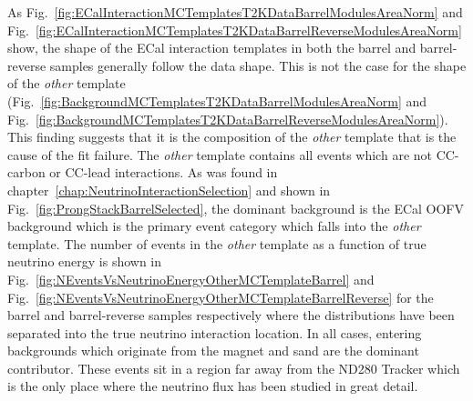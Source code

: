 As Fig.~\ref{fig:ECalInteractionMCTemplatesT2KDataBarrelModulesAreaNorm} and Fig.~\ref{fig:ECalInteractionMCTemplatesT2KDataBarrelReverseModulesAreaNorm} show, the shape of the ECal interaction templates in both the barrel and barrel-reverse samples generally follow the data shape.  This is not the case for the shape of the \textit{other} template (Fig.~\ref{fig:BackgroundMCTemplatesT2KDataBarrelModulesAreaNorm} and Fig.~\ref{fig:BackgroundMCTemplatesT2KDataBarrelReverseModulesAreaNorm}).  This finding suggests that it is the composition of the \textit{other} template that is the cause of the fit failure.  The \textit{other} template contains all events which are not CC-carbon or CC-lead interactions.  As was found in chapter~\ref{chap:NeutrinoInteractionSelection} and shown in Fig.~\ref{fig:ProngStackBarrelSelected}, the dominant background is the ECal OOFV background which is the primary event category which falls into the \textit{other} template.  The number of events in the \textit{other} template as a function of true neutrino energy is shown in Fig.~\ref{fig:NEventsVsNeutrinoEnergyOtherMCTemplateBarrel} and Fig.~\ref{fig:NEventsVsNeutrinoEnergyOtherMCTemplateBarrelReverse} for the barrel and barrel-reverse samples respectively where the distributions have been separated into the true neutrino interaction location.  In all cases, entering backgrounds which originate from the magnet and sand are the dominant contributor.  These events sit in a region far away from the ND280 Tracker which is the only place where the neutrino flux has been studied in great detail. 
